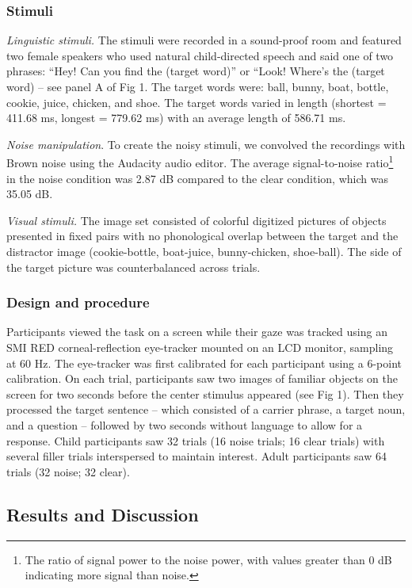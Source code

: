 \documentclass[10pt, letterpaper]{article}
\begin{document}
\subsubsection{Stimuli}\label{stimuli}

\emph{Linguistic stimuli.} The stimuli were recorded in a sound-proof
room and featured two female speakers who used natural child-directed
speech and said one of two phrases: ``Hey! Can you find the (target
word)'' or ``Look! Where's the (target word) -- see panel A of Fig 1.
The target words were: ball, bunny, boat, bottle, cookie, juice,
chicken, and shoe. The target words varied in length (shortest = 411.68
ms, longest = 779.62 ms) with an average length of 586.71 ms.

\emph{Noise manipulation}. To create the noisy stimuli, we convolved the
recordings with Brown noise using the Audacity audio editor. The average
signal-to-noise ratio\footnote{The ratio of signal power to the noise
  power, with values greater than 0 dB indicating more signal than
  noise.} in the noise condition was 2.87 dB compared to the clear
condition, which was 35.05 dB.

\emph{Visual stimuli.} The image set consisted of colorful digitized
pictures of objects presented in fixed pairs with no phonological
overlap between the target and the distractor image (cookie-bottle,
boat-juice, bunny-chicken, shoe-ball). The side of the target picture
was counterbalanced across trials.

\subsubsection{Design and procedure}\label{design-and-procedure}

Participants viewed the task on a screen while their gaze was tracked
using an SMI RED corneal-reflection eye-tracker mounted on an LCD
monitor, sampling at 60 Hz. The eye-tracker was first calibrated for
each participant using a 6-point calibration. On each trial,
participants saw two images of familiar objects on the screen for two
seconds before the center stimulus appeared (see Fig 1). Then they
processed the target sentence -- which consisted of a carrier phrase, a
target noun, and a question -- followed by two seconds without language
to allow for a response. Child participants saw 32 trials (16 noise
trials; 16 clear trials) with several filler trials interspersed to
maintain interest. Adult participants saw 64 trials (32 noise; 32
clear).

\subsection{Results and Discussion}\label{results-and-discussion}
\end{document}
